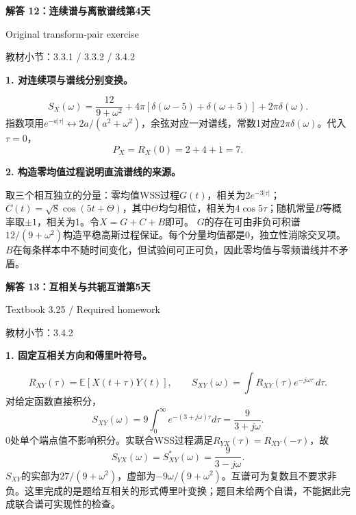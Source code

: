 \documentclass[10.5pt,fontset=fandol]{ctexart}
\newcommand{\E}{\mathbb E}\newcommand{\ee}{\mathrm e}\newcommand{\jj}{\mathrm j}
\newcommand{\qtitle}[2]{\par\addvspace{.85em}\Needspace{10\baselineskip}\begin{tcolorbox}[colback=navy,colframe=navy,arc=1.5pt,boxrule=0pt]\color{white}\large\bfseries #1\hfill\small #2\end{tcolorbox}}
\newcommand{\step}[1]{\par\addvspace{.4em}\Needspace{4\baselineskip}\textbf{#1}\par}\hypersetup{pdftitle={SSA Chapter 3 Review Solutions - Chinese}}
\begin{document}
\qtitle{解答 12：连续谱与离散谱线}{第4天}
{\small\color{accentred}Original transform-pair exercise}\par{\small\color{muted}教材小节：3.3.1 / 3.3.2 / 3.4.2}\par\smallskip\step{1. 对连续项与谱线分别变换。}
\[\boxed{S_X(\omega)=\frac{12}{9+\omega^2}
+4\pi[\delta(\omega-5)+\delta(\omega+5)]+2\pi\delta(\omega)}.\]
指数项用$e^{-a|\tau|}\leftrightarrow2a/(a^2+\omega^2)$，余弦对应一对谱线，常数1对应$2\pi\delta(\omega)$。代入$\tau=0$，
\[\boxed{P_X=R_X(0)=2+4+1=7}.\]
\step{2. 构造零均值过程说明直流谱线的来源。}
取三个相互独立的分量：零均值WSS过程$G(t)$，相关为$2e^{-3|\tau|}$；$C(t)=\sqrt8\cos(5t+\Theta)$，其中$\Theta$均匀相位，相关为$4\cos5\tau$；随机常量$B$等概率取$\pm1$，相关为1。令$X=G+C+B$即可。
$G$的存在可由非负可积谱$12/(9+\omega^2)$构造平稳高斯过程保证。每个分量均值都是0，独立性消除交叉项。$B$在每条样本中不随时间变化，但试验间可正可负，因此零均值与零频谱线并不矛盾。

\qtitle{解答 13：互相关与共轭互谱}{第5天}
{\small\color{accentred}Textbook 3.25 / Required homework}\par{\small\color{muted}教材小节：3.4.2}\par\smallskip\step{1. 固定互相关方向和傅里叶符号。}
\[R_{XY}(\tau)=\E[X(t+\tau)Y(t)],\qquad
S_{XY}(\omega)=\int R_{XY}(\tau)e^{-j\omega\tau}\,d\tau.\]
对给定函数直接积分，
\[S_{XY}(\omega)=9\int_0^\infty e^{-(3+j\omega)\tau}d\tau
=\boxed{\frac9{3+j\omega}}.\]
0处单个端点值不影响积分。实联合WSS过程满足$R_{YX}(\tau)=R_{XY}(-\tau)$，故
\[\boxed{S_{YX}(\omega)=S_{XY}^*(\omega)=\frac9{3-j\omega}}.\]
$S_{XY}$的实部为$27/(9+\omega^2)$，虚部为$-9\omega/(9+\omega^2)$。互谱可为复数且不要求非负。这里完成的是题给互相关的形式傅里叶变换；题目未给两个自谱，不能据此完成联合谱可实现性的检查。
\end{document}

